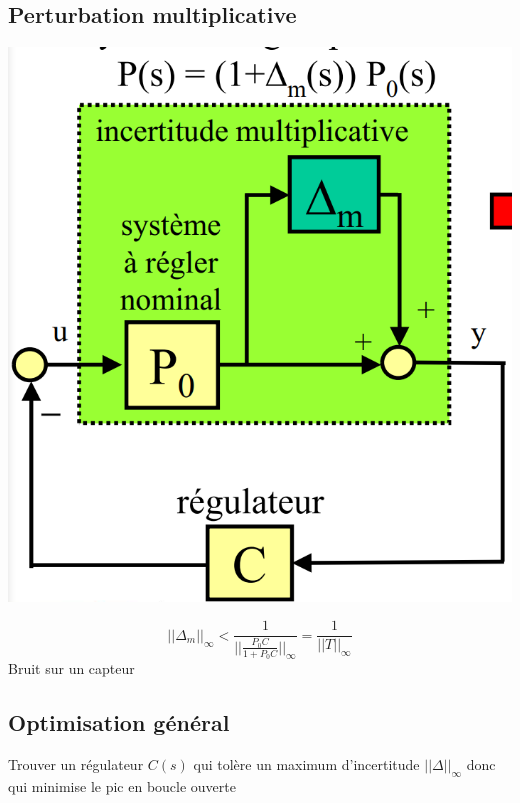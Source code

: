 \documentclass[resume]{subfiles}
\begin{document}
\subsection{Perturbation multiplicative}

\begin{center}
\includegraphics[width=0.5\columnwidth]{FiguresTypora/image-20220602100455177.png}
\end{center}

$$||\Delta_m||_{\infty} < \frac{1}{||\frac{P_0C}{1+P_0C}||_{\infty}}= \frac{1}{||T||_{\infty}}$$
Bruit sur un capteur

\subsection{Optimisation général}

Trouver un régulateur $C(s)$ qui tolère un maximum d'incertitude $||\Delta||_{\infty}$ donc qui minimise le pic en boucle ouverte 
\end{document}
